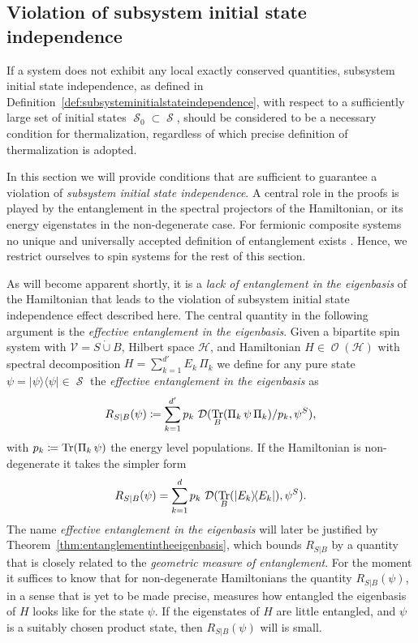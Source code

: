 \documentclass[a4paper,12pt,listof=totoc,index=totoc,bibliography=totoc,headsepline=false,headings=normal,BCOR16.153846mm,DIV12,headinclude,twoside,cleardoublepage=empty,numbers=noenddot,final]{scrreprt}
\theoremstyle{mystyle}
\numberwithin{equation}{section}
\numberwithin{figure}{section}
\numberwithin{lemma}{section}
\numberwithin{theorem}{section}
\numberwithin{corollary}{section}
\numberwithin{definition}{section}
\numberwithin{conjecture}{section}
\numberwithin{observation}{section}
\newcommand{\+}{\mkern2mu}
\newcommand{\coloneqq}{\mathrel{\vcentcolon\mkern-1.2mu=}} %
\newcommand{\dunion}{\mathbin{\dot{\cup}}}
\renewcommand{\H}{H}
\newcommand{\Vset}{\mathcal{V}}
\newcommand{\bra}[1]{\langle #1|}
\newcommand{\ket}[1]{|#1\rangle}
\newcommand{\ketbra}[2]{\ket{#1}\!\bra{#2}}
\newcommand{\tracedistance}[3][]{
  \ifthenelse{\equal{#2}{}}
  {\ifthenelse{\equal{#3}{}}
    {\mathcal{D}_{#1}}{}
  }{
    \ifthenelse{\equal{#1}{}}
    {\operatorname{\mathcal{D}}(#2,#3)}
    {\operatorname{\mathcal{D}}_{#1}(#2,#3)}
  }
}
\DeclareMathOperator{\1}{\mathds{1}}
\DeclareMathOperator{\Obs}{\mathcal{O}}
\DeclareMathOperator{\Qst}{\mathcal{S}}
\DeclareMathOperator{\Tr}{Tr}
\newcommand{\mc}[1]{\mathcal{#1}}
\newcommand{\mcH}{\mc{H}}
\begin{document}
\subsection{Violation of subsystem initial state independence}
\label{sec:violationofinitialstateindependence}
%
If a system does not exhibit any local exactly conserved quantities, subsystem initial state independence, as defined in Definition~\ref{def:subsysteminitialstateindependence}, with respect to a sufficiently large set of initial states $\Qst_0 \subset \Qst$, should be considered to be a necessary condition for thermalization, regardless of which precise definition of thermalization is adopted.

In this section we will provide conditions that are sufficient to guarantee a violation of \emph{subsystem initial state independence}.
A central role in the proofs is played by the entanglement in the spectral projectors of the Hamiltonian, or its energy eigenstates in the non-degenerate case.
For fermionic composite systems no unique and universally accepted definition of entanglement exists \cite{Banuls2007}.
Hence, we restrict ourselves to spin systems for the rest of this section.

As will become apparent shortly, it is a \emph{lack of entanglement in the eigenbasis} of the Hamiltonian that leads to the violation of subsystem initial state independence effect described here.
The central quantity in the following argument is the \emph{effective entanglement in the eigenbasis}.
Given a bipartite spin system with $\Vset = S \dunion B$, Hilbert space $\mcH$, and Hamiltonian $\H \in \Obs(\mcH)$ with spectral decomposition $\H = \sum_{k=1}^{d'} E_k\,\Pi_k$ we define for any pure state $\psi = \ketbra\psi\psi \in \Qst$ the \emph{effective entanglement in the eigenbasis} as
\begin{equation}
  R_{S|B}(\psi) \coloneqq \sum_{k=1}^{d'} p_k\,\tracedistance{\Tr_B(\Pi_k\,\psi\,\Pi_k)/p_k}{\psi^S} ,
\end{equation}
with $p_k \coloneqq \Tr(\Pi_k\,\psi)$ the energy level populations.
If the Hamiltonian is non-degenerate it takes the simpler form
\begin{equation} \label{eq:effectiveentranglementintheeigenbasisnondegenerate}
  R_{S|B}(\psi) = \sum_{k=1}^{d} p_k\,\tracedistance{\Tr_B(\ketbra{E_k}{E_k})}{\psi^S} .
\end{equation}
The name \emph{effective entanglement in the eigenbasis} will later be justified by Theorem~\ref{thm:entanglementintheeigenbasis}, which bounds $R_{S|B}$ by a quantity that is closely related to the \emph{geometric measure of entanglement}.
For the moment it suffices to know that for non-degenerate Hamiltonians the quantity $R_{S|B}(\psi)$, in a sense that is yet to be made precise, measures how entangled the eigenbasis of $\H$ looks like for the state $\psi$.
If the eigenstates of $\H$ are little entangled, and $\psi$ is a suitably chosen product state, then $R_{S|B}(\psi)$ will is small.
\end{document}
